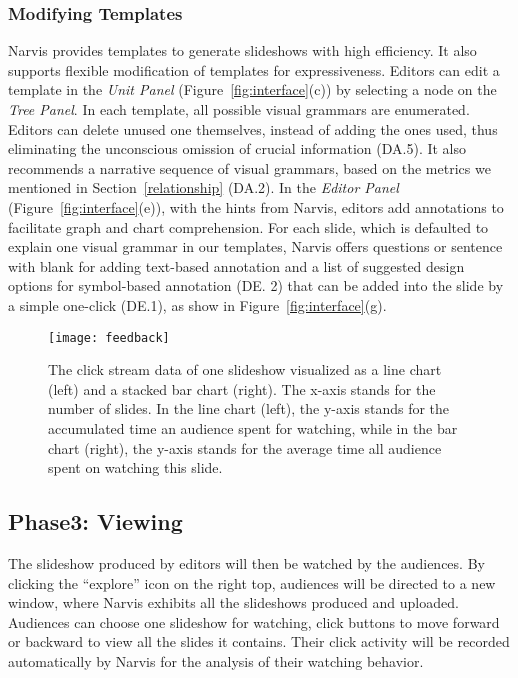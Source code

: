 \subsubsection{Modifying Templates} 
Narvis provides templates to generate slideshows with high efficiency. 
It also supports flexible modification of templates for expressiveness.
Editors can edit a template in the \textit{Unit Panel} (Figure~\ref{fig:interface}(c)) by selecting a node on the \textit{Tree Panel}. In each template, all possible visual grammars are enumerated. Editors can delete unused one themselves, instead of adding the ones used, thus eliminating the unconscious omission of crucial information (DA.5).
It also recommends a narrative sequence of visual grammars, based on the metrics we mentioned in Section~\ref{relationship} (DA.2). 
In the \textit{Editor Panel} (Figure~\ref{fig:interface}(e)), with the hints from Narvis, editors add annotations to facilitate graph and chart comprehension. For each slide, which is defaulted to explain one visual grammar in our templates, Narvis offers questions or sentence with blank for adding text-based annotation and a list of suggested design options for symbol-based annotation (DE. 2) that can be added into the slide by a simple one-click (DE.1), as show in Figure~\ref{fig:interface}(g).



\begin{figure}
 \centering 
 \texttt{[image: feedback]}
 \caption{The click stream data of one slideshow visualized as a line chart (left) and a stacked bar chart (right). The x-axis stands for the number of slides. In the line chart (left), the y-axis stands for the accumulated time an audience spent for watching, while in the bar chart (right), the y-axis stands for the average time all audience spent on watching this slide. }
 \label{fig:feedback}
\end{figure}


\subsection{Phase3: Viewing}
The slideshow produced by editors will then be watched by the audiences. By clicking the ``explore'' icon on the right top, audiences will be directed to a new window, where Narvis exhibits all the slideshows produced and uploaded.
Audiences can choose one slideshow for watching, click buttons to move forward or backward to view all the slides it contains. Their click activity will be recorded automatically by Narvis for the analysis of their watching behavior. 

